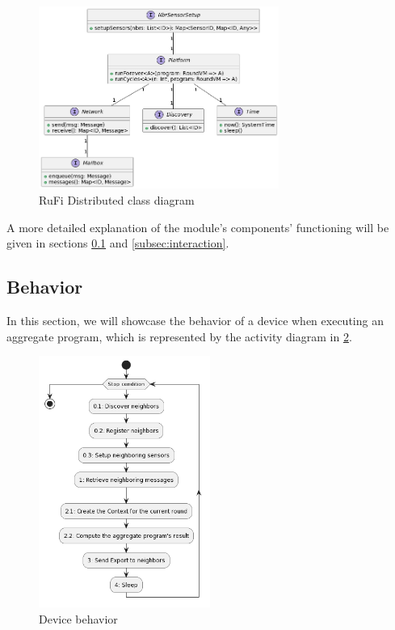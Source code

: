 \begin{figure}[ht!]
    \centering
    \includegraphics[width=0.7\textwidth]{figures/diagrams/img/rufi-distributed-class.png}
    \caption{RuFi Distributed class diagram}
    \label{fig:distributed-class}
\end{figure}

A more detailed explanation of the module's components' functioning will be given in sections \ref{subsec:behavior} and \ref{subsec:interaction}.

\subsection{Behavior}
\label{subsec:behavior}
In this section, we will showcase the behavior of a device when executing an aggregate program, which is represented by the activity diagram in \cref{fig:behavior}.

\begin{figure}[ht!]
    \centering
    \includegraphics[width=0.5\textwidth]{figures/diagrams/img/platform-activity.png}
    \caption{Device behavior}
    \label{fig:behavior}
\end{figure}

